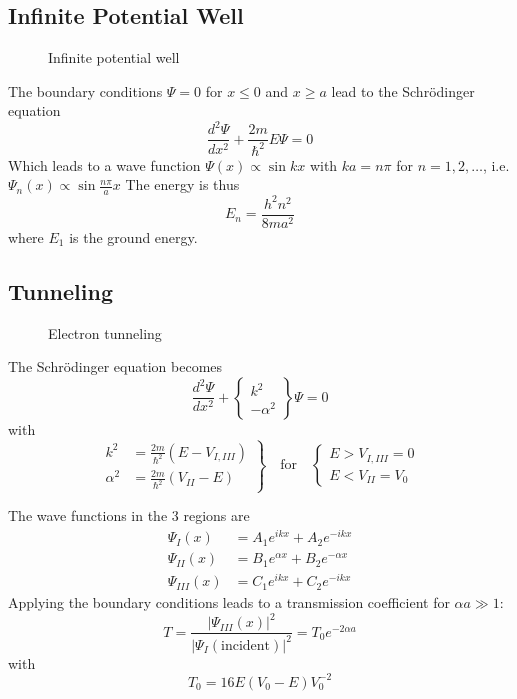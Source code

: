 \subsection{Infinite Potential Well}
\begin{figure}[ht!]
    \centering
    
    \caption{Infinite potential well}
\end{figure}
The boundary conditions $\Psi=0$ for $x\leq 0$ and $x\geq a$ lead to the Schrödinger equation
\begin{equation}
    \frac{d^2 \Psi}{d x^2} + \frac{2m}{\hbar^2} E \Psi = 0
\end{equation}
Which leads to a wave function $\Psi(x) \propto \sin kx$ with $ka=n\pi$ for $n=1,2,\ldots$, i.e. $\Psi_n(x) \propto \sin\frac{n\pi}{a}x$
The energy is thus
\begin{equation}
    E_n = \frac{h^2 n^2}{8 m a^2}
\end{equation}
where $E_1$ is the ground energy.

\subsection{Tunneling}
\begin{figure}[ht!]
    \centering
    
    \caption{Electron tunneling}
\end{figure}

The Schrödinger equation becomes
\begin{equation}
    \frac{d^2 \Psi}{dx^2} + \begin{Bmatrix} k^2 \\ -\alpha^2 \end{Bmatrix} \Psi = 0
\end{equation}
with
\begin{equation}
    \left.\begin{matrix}
        k^2 &= \frac{2m}{\hbar^2} (E-V_{I,III}) \\
        \alpha^2 &= \frac{2m}{\hbar^2}(V_{II}-E)
    \end{matrix}\right\}
    \quad\text{for}\quad
    \left\{\begin{matrix}
        E>V_{I,III}=0\\
        E<V_{II}=V_0
    \end{matrix}\right.
\end{equation}

The wave functions in the 3 regions are
\begin{align}
    \Psi_{I}(x) &= A_1 e^{ikx} + A_2 e^{-ikx} \\
    \Psi_{II}(x) &= B_1 e^{\alpha x} + B_2 e^{-\alpha x} \\
    \Psi_{III}(x) &= C_1 e^{ikx} + C_2 e^{-ikx} 
\end{align}
Applying the boundary conditions leads to a transmission coefficient for $\alpha a \gg 1$:
\begin{equation}
    T = \frac{\left| \Psi_{III}(x) \right|^2}{\left| \Psi_{I}(\text{incident}) \right|^2} = T_0 e^{-2\alpha a}
\end{equation}
with
\begin{equation}
    T_0 = 16 E(V_0-E)V_0^{-2}
\end{equation}

